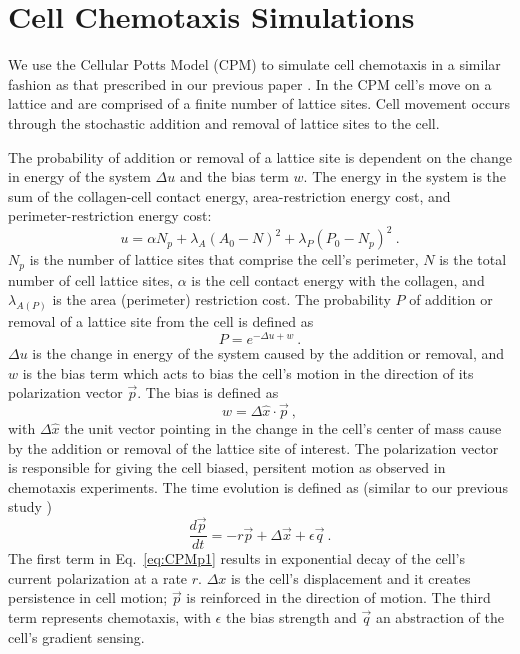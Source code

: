 \section{Cell Chemotaxis Simulations}


We use the Cellular Potts Model (CPM) to simulate cell chemotaxis in a similar fashion as that prescribed in our previous paper \cite{varennes2016collective}. In the CPM cell's move on a lattice and are comprised of a finite number of lattice sites. Cell movement occurs through the stochastic addition and removal of lattice sites to the cell.

The probability of addition or removal of a lattice site is dependent on the change in energy of the system $\Delta u$ and the bias term $w$. The energy in the system is the sum of the collagen-cell contact energy, area-restriction energy cost, and perimeter-restriction energy cost:
\begin{equation} \label{eq:CPMu1}
    u = \alpha N_p + \lambda_A(A_0 - N)^2 + \lambda_P(P_0 - N_p)^2 \ .
\end{equation}
$N_p$ is the number of lattice sites that comprise the cell's perimeter, $N$ is the total number of cell lattice sites, $\alpha$ is the cell contact energy with the collagen, and $\lambda_{A(P)}$ is the area (perimeter) restriction cost. The probability $P$ of addition or removal of a lattice site from the cell is defined as
\begin{equation} \label{eq:CPMprob1}
    P = e^{-\Delta u + w} \ .
\end{equation}
$\Delta u$ is the change in energy of the system caused by the addition or removal, and $w$ is the bias term which acts to bias the cell's motion in the direction of its polarization vector $\vec{p}$. The bias is defined as
\begin{equation}
    w = \Delta\hat{x} \cdot \vec{p} \ ,
\end{equation}
with $\Delta\hat{x}$ the unit vector pointing in the change in the cell's center of mass cause by the addition or removal of the lattice site of interest. The polarization vector is responsible for giving the cell biased, persitent motion as observed in chemotaxis experiments. The time evolution is defined as (similar to our previous study \red{[CITE]})
\begin{equation} \label{eq:CPMp1}
    \frac{d\vec{p}}{dt} = -r\vec{p} + \Delta\vec{x} + \epsilon \vec{q}\ .
\end{equation}
The first term in Eq.\ \ref{eq:CPMp1} results in exponential decay of the cell's current polarization at a rate $r$. $\Delta x$ is the cell's displacement and it creates persistence in cell motion; $\vec{p}$ is reinforced in the direction of motion. The third term represents chemotaxis, with $\epsilon$ the bias strength and $\vec{q}$ an abstraction of the cell's gradient sensing.
